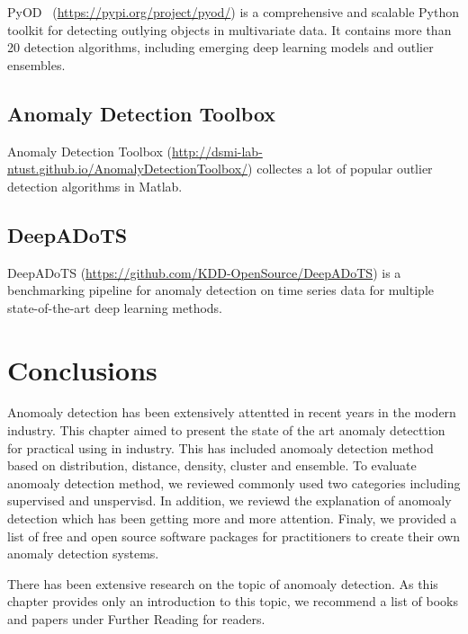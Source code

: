 PyOD~\cite{zhao2019pyod} (\href{https://pypi.org/project/pyod/}{https://pypi.org/project/pyod/})
is a comprehensive and scalable Python toolkit for
detecting outlying objects in multivariate data.
It contains more than 20 detection algorithms,
including emerging deep learning models and
outlier ensembles.

\subsection{Anomaly Detection Toolbox}

Anomaly Detection Toolbox
(\href{http://dsmi-lab-ntust.github.io/AnomalyDetectionToolbox/}{http://dsmi-lab-ntust.github.io/AnomalyDetectionToolbox/})
collectes a lot of popular outlier detection algorithms in Matlab.

\subsection{DeepADoTS}

DeepADoTS (\href{https://github.com/KDD-OpenSource/DeepADoTS}{https://github.com/KDD-OpenSource/DeepADoTS})
is a benchmarking pipeline for anomaly detection on
time series data for
multiple state-of-the-art deep learning methods.


\section{Conclusions} \label{sec-conclusions}

Anomoaly detection has been extensively
attentted in recent years in the modern industry.
This chapter aimed to present the state of the art 
anomaly detecttion for practical using in industry.
This has included anomoaly detection method based on distribution, 
distance,
density,
cluster and ensemble.
To evaluate anomoaly detection method,
we reviewed commonly used 
two categories including supervised and unspervisd.
In addition,
we reviewd the explanation of anomoaly detection which
has been getting more and more attention. 
Finaly,
we provided a list of free and open source software packages for
practitioners to create their own anomaly detection systems.


There has been extensive research on the topic of anomoaly detection.
As this chapter provides only an introduction to this
topic,
we recommend a list of books and 
papers under Further Reading for readers.







